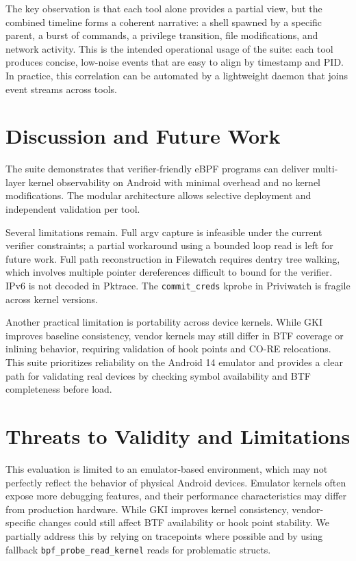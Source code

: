 \documentclass[conference]{IEEEtran}
\begin{document}
The key observation is that each tool alone provides a partial view, but the combined timeline forms a coherent narrative: a shell spawned by a specific parent, a burst of commands, a privilege transition, file modifications, and network activity. This is the intended operational usage of the suite: each tool produces concise, low-noise events that are easy to align by timestamp and PID. In practice, this correlation can be automated by a lightweight daemon that joins event streams across tools.

\section{Discussion and Future Work}

The suite demonstrates that verifier-friendly eBPF programs can deliver multi-layer kernel observability on Android with minimal overhead and no kernel modifications. The modular architecture allows selective deployment and independent validation per tool.

Several limitations remain. Full argv capture is infeasible under the current verifier constraints; a partial workaround using a bounded loop read is left for future work. Full path reconstruction in Filewatch requires dentry tree walking, which involves multiple pointer dereferences difficult to bound for the verifier. IPv6 is not decoded in Pktrace. The \texttt{commit\_creds} kprobe in Priviwatch is fragile across kernel versions.

Another practical limitation is portability across device kernels. While GKI improves baseline consistency, vendor kernels may still differ in BTF coverage or inlining behavior, requiring validation of hook points and CO-RE relocations. This suite prioritizes reliability on the Android 14 emulator and provides a clear path for validating real devices by checking symbol availability and BTF completeness before load.

\section{Threats to Validity and Limitations}
This evaluation is limited to an emulator-based environment, which may not perfectly reflect the behavior of physical Android devices. Emulator kernels often expose more debugging features, and their performance characteristics may differ from production hardware. While GKI improves kernel consistency, vendor-specific changes could still affect BTF availability or hook point stability. We partially address this by relying on tracepoints where possible and by using fallback \texttt{bpf\_probe\_read\_kernel} reads for problematic structs.
\end{document}
